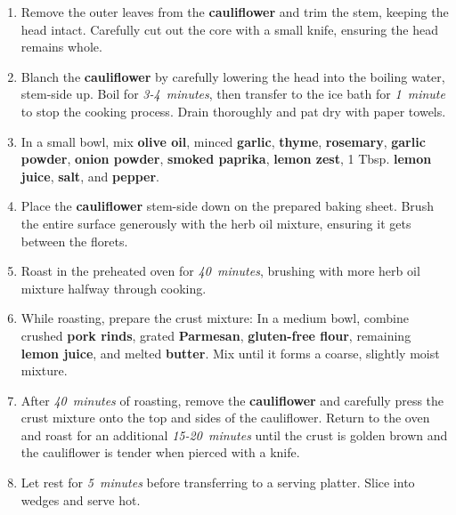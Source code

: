 \documentclass[11pt,letterpaper]{article}
\begin{document}
\begin{enumerate}
    \item Remove the outer leaves from the \textbf{cauliflower} and trim the stem, keeping the head intact. Carefully cut out the core with a small knife, ensuring the head remains whole.
    
    \item Blanch the \textbf{cauliflower} by carefully lowering the head into the boiling water, stem-side up. Boil for \textit{3-4~minutes}, then transfer to the ice bath for \textit{1~minute} to stop the cooking process. Drain thoroughly and pat dry with paper towels.
    
    \item In a small bowl, mix \textbf{olive oil}, minced \textbf{garlic}, \textbf{thyme}, \textbf{rosemary}, \textbf{garlic powder}, \textbf{onion powder}, \textbf{smoked paprika}, \textbf{lemon zest}, 1 Tbsp. \textbf{lemon juice}, \textbf{salt}, and \textbf{pepper}.
    
    \item Place the \textbf{cauliflower} stem-side down on the prepared baking sheet. Brush the entire surface generously with the herb oil mixture, ensuring it gets between the florets.
    
    \item Roast in the preheated oven for \textit{40~minutes}, brushing with more herb oil mixture halfway through cooking.
    
    \item While roasting, prepare the crust mixture: In a medium bowl, combine crushed \textbf{pork rinds}, grated \textbf{Parmesan}, \textbf{gluten-free flour}, remaining \textbf{lemon juice}, and melted \textbf{butter}. Mix until it forms a coarse, slightly moist mixture.
    
    \item After \textit{40~minutes} of roasting, remove the \textbf{cauliflower} and carefully press the crust mixture onto the top and sides of the cauliflower. Return to the oven and roast for an additional \textit{15-20~minutes} until the crust is golden brown and the cauliflower is tender when pierced with a knife.
    
    \item Let rest for \textit{5~minutes} before transferring to a serving platter. Slice into wedges and serve hot.
\end{enumerate}

\newpage
\end{document}
